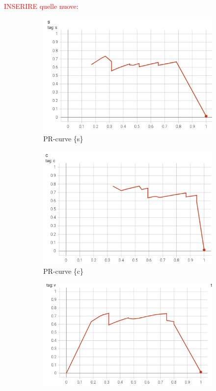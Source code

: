 \textcolor{red}{INSERIRE quelle nuove}:
\begin{figure}[htbp]
    \centering
    \begin{subfigure}[t]{0.32\textwidth}
        \centering
        \includegraphics[width=\textwidth]{images/pr_curve_conf1.png}
        \caption{PR-curve \{s\}}
    \end{subfigure}
    \begin{subfigure}[t]{0.32\textwidth}
        \centering
        \includegraphics[width=\textwidth]{images/pr_curve_conf2.png}
        \caption{PR-curve \{c\}}
    \end{subfigure}
    \begin{subfigure}[t]{0.32\textwidth}
        \centering
        \includegraphics[width=\textwidth]{images/pr_curve_conf3.png}

\end{subfigure}
\end{figure}
